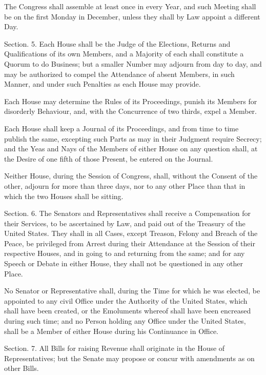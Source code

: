 \documentclass{article}
\begin{document}
The Congress shall assemble at least once in every Year, and such
Meeting shall be on the first Monday in December, unless they shall by
Law appoint a different Day.

Section. 5.  Each House shall be the Judge of the Elections, Returns and
Qualifications of its own Members, and a Majority of each shall
constitute a Quorum to do Business; but a smaller Number may adjourn
from day to day, and may be authorized to compel the Attendance of
absent Members, in such Manner, and under such Penalties as each House
may provide.

Each House may determine the Rules of its Proceedings, punish its
Members for disorderly Behaviour, and, with the Concurrence of two
thirds, expel a Member.

Each House shall keep a Journal of its Proceedings, and from time to
time publish the same, excepting such Parts as may in their Judgment
require Secrecy; and the Yeas and Nays of the Members of either House on
any question shall, at the Desire of one fifth of those Present, be
entered on the Journal.

Neither House, during the Session of Congress, shall, without the
Consent of the other, adjourn for more than three days, nor to any other
Place than that in which the two Houses shall be sitting.

Section. 6.  The Senators and Representatives shall receive a
Compensation for their Services, to be ascertained by Law, and paid out
of the Treasury of the United States. They shall in all Cases, except
Treason, Felony and Breach of the Peace, be privileged from Arrest
during their Attendance at the Session of their respective Houses, and
in going to and returning from the same; and for any Speech or Debate in
either House, they shall not be questioned in any other Place.

No Senator or Representative shall, during the Time for which he was
elected, be appointed to any civil Office under the Authority of the
United States, which shall have been created, or the Emoluments whereof
shall have been encreased during such time; and no Person holding any
Office under the United States, shall be a Member of either House during
his Continuance in Office.

Section. 7.  All Bills for raising Revenue shall originate in the House
of Representatives; but the Senate may propose or concur with amendments
as on other Bills.
\end{document}

